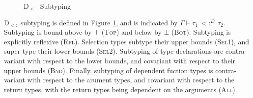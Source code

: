 \documentclass[runningheads]{llncs}
\begin{document}
\begin{figure}[t]
\small
{}
\caption{D$_{<:}$ Subtyping}
\label{f:dsub:subtyping}
\end{figure}
D$_{<:}$ subtyping is defined in Figure \ref{f:dsub:subtyping}, and is indicated by $\Gamma \vdash \tau_1\ <:^D\ \tau_2$. Subtyping is bound above by $\top$ (\textsc{Top}) and below by $\bot$ (\textsc{Bot}).
Subtyping is explicitly reflexive (\textsc{Rfl}). Selection types subtype their upper bounds (\textsc{Sel1}), and super type their lower bounds (\textsc{Sel2}).
Subtyping of type declarations are contra-variant with respect to the lower bounds, and covariant with respect to their upper bounds (\textsc{Bnd}).
Finally, subtyping of dependent fuction types is contra-variant with respect to the arument types, and covariant with respect to the return types, 
with the return types being dependent on the arguments (\textsc{All}).
\end{document}
